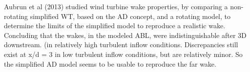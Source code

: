 Aubrun et al (2013) \cite{Aubrun2013} studied wind turbine wake properties, by comparing a non-rotating simplified WT, based on the AD concept, and a rotating model, to determine the limits of the simplified model to reproduce a realistic wake. Concluding that the wakes, in the modeled ABL, were indistinguishable after 3D downstream. (in relatively high turbulent inflow conditions. Discrepancies still exist at x/d = 3 in low turbulent inflow conditions, but are relatively minor.  So the simplified AD model seems to be usable to reproduce the far wake. 








